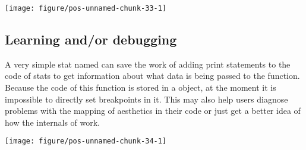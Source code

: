 \documentclass[paper=a4,10pt,div=17,headsepline,BCOR=12mm,twoside,open=right]{scrbook}\usepackage{knitr}
\begin{document}
\begin{knitrout}\footnotesize
{}\color{fgcolor}\begin{kframe}
\begin{alltt}
 \hlkwb{<-}  \hlopt{~}  \hlstd{,}  \hlstd{=} \hlstd{)}
    \hlopt{+}
  \hlstd{()} \hlopt{+}
  \hlstd{(} \hlstd{=} \hlstd{,}   \hlopt{+}
  \hlstd{(}\hlstd{(}   \hlstd{=} \hlstd{(}\hlopt{-}\hlstd{,} \hlstd{),}
                  \hlstd{=} \hlstd{)} \hlopt{+}
  \hlstd{()} \hlopt{+}
  \hlstd{(} \hlstd{=} \hlstd{)}
\end{alltt}
\end{kframe}

{\centering \texttt{[image: figure/pos-unnamed-chunk-33-1]} 

}



\end{knitrout}

\subsection{Learning and/or debugging}

A very simple stat named  can save the work of adding print statements to the code of stats to get information about what data is being passed to the  function. Because the code of this function is stored in a  object, at the moment it is impossible to directly set breakpoints in it. This  may also help users diagnose problems with the mapping of aesthetics in their code or just get a better idea of how the internals of \ggplot work.

\begin{knitrout}\footnotesize
{}\color{fgcolor}\begin{kframe}
\begin{alltt}
  \hlopt{+} \hlstd{()} \hlopt{+}
  \hlstd{(} \hlstd{=} \hlstd{)}
\end{alltt}
\end{kframe}

{\centering \texttt{[image: figure/pos-unnamed-chunk-34-1]} 

}



\end{knitrout}
\end{document}
